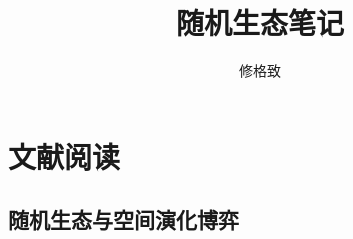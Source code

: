 \documentclass{book}
\title{随机生态笔记}
\author{修格致}
\begin{document}
\begin{titlepage}
    \maketitle
\end{titlepage}

\tableofcontents
\newpage
\part{文献阅读}
\chapter{随机生态与空间演化博弈}

\end{document}
